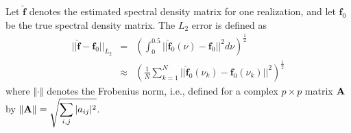 \documentclass[%
 reprint,
 amsmath,amssymb,
 aps,
]{revtex4-2}
\begin{document}
Let $\hat{\bm{f}}$ denotes the estimated spectral density matrix for one realization, and let $\bm{f}_0$ be the true spectral density matrix. 
The $L_2$ error is defined as
\begin{eqnarray*}
||\hat{\bm{f}} - \bm{f}_0||_{L_2} &=& \left(\int_{0}^{0.5} ||\hat{\bm{f}}_0(\nu) - \bm{f}_0||^2 d\nu \right)^{\frac{1}{2}} \\
&\approx &\left(\frac{1}{N} \sum_{k=1}^{N}||\hat{\bm{f}}_0(\nu_k)-\bm{f}_0(\nu_k)||^2 \right)^{\frac{1}{2}}
\end{eqnarray*}
where $\Vert \cdot \Vert$ denotes the Frobenius norm, i.e., defined for a complex $p\times p$ matrix ${\bf A}$ by
$\displaystyle \Vert {\bf A}\Vert= \sqrt{\sum_{i,j} |a_{ij}|^2}$.
\end{document}
